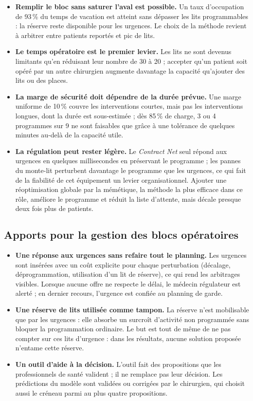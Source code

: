 \documentclass[11pt,a4paper]{article}
\begin{document}
\begin{itemize}
    \item \textbf{Remplir le bloc sans saturer l'aval est possible.} Un taux d'occupation de 93\,\% du temps de vacation est atteint sans dépasser les lits programmables : la réserve reste disponible pour les urgences. Le choix de la méthode revient à arbitrer entre patients reportés et pic de lits.
    \item \textbf{Le temps opératoire est le premier levier.} Les lits ne sont devenus limitants qu'en réduisant leur nombre de 30 à 20 ; accepter qu'un patient soit opéré par un autre chirurgien augmente davantage la capacité qu'ajouter des lits ou des places.
    \item \textbf{La marge de sécurité doit dépendre de la durée prévue.} Une marge uniforme de 10\,\% couvre les interventions courtes, mais pas les interventions longues, dont la durée est sous-estimée ; dès 85\,\% de charge, 3 ou 4 programmes sur 9 ne sont faisables que grâce à une tolérance de quelques minutes au-delà de la capacité utile.
    \item \textbf{La régulation peut rester légère.} Le \emph{Contract Net} seul répond aux urgences en quelques millisecondes en préservant le programme ; les pannes du monte-lit perturbent davantage le programme que les urgences, ce qui fait de la fiabilité de cet équipement un levier organisationnel. Ajouter une réoptimisation globale par la mémétique, la méthode la plus efficace dans ce rôle, améliore le programme et réduit la liste d'attente, mais décale presque deux fois plus de patients.
\end{itemize}

\subsection{Apports pour la gestion des blocs opératoires}

\begin{itemize}
    \item \textbf{Une réponse aux urgences sans refaire tout le planning.} Les urgences sont insérées avec un coût explicite pour chaque perturbation (décalage, déprogrammation, utilisation d'un lit de réserve), ce qui rend les arbitrages visibles. Lorsque aucune offre ne respecte le délai, le médecin régulateur est alerté ; en dernier recours, l'urgence est confiée au planning de garde.
    \item \textbf{Une réserve de lits utilisée comme tampon.} La réserve n'est mobilisable que par les urgences : elle absorbe un surcroît d'activité non programmée sans bloquer la programmation ordinaire. Le but est tout de même de ne pas compter sur ces lits d'urgence : dans les résultats, aucune solution proposée n'entame cette réserve.
    \item \textbf{Un outil d'aide à la décision.} L'outil fait des propositions que les professionnels de santé valident ; il ne remplace pas leur décision. Les prédictions du modèle sont validées ou corrigées par le chirurgien, qui choisit aussi le créneau parmi au plus quatre propositions.
\end{itemize}
\end{document}
